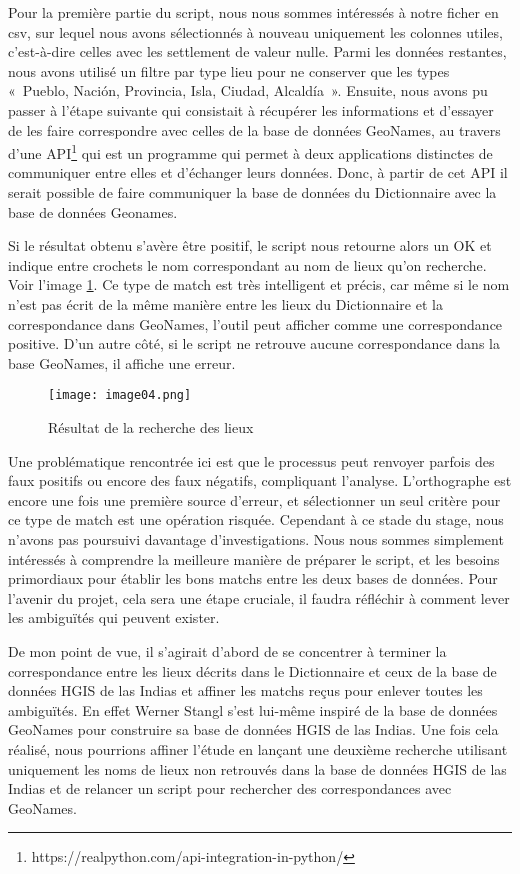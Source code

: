 \documentclass[a4paper,12pt,twoside]{book}
\begin{document}
Pour la première partie du script, nous nous sommes intéressés à notre ficher en csv, sur lequel nous avons sélectionnés à nouveau uniquement les colonnes utiles, c’est-à-dire celles avec les settlement de valeur nulle. Parmi les données restantes, nous avons utilisé un filtre par type lieu pour ne conserver que les types « Pueblo, Nación,  Provincia, Isla, Ciudad,  Alcaldía ». Ensuite, nous avons pu passer à l’étape suivante qui consistait à récupérer les informations et d’essayer de les faire correspondre avec celles de la base de données GeoNames, au travers d’une \Gls{API}\footnote{https://realpython.com/api-integration-in-python/} qui est un programme qui permet à deux applications distinctes de communiquer entre elles et d’échanger leurs données. Donc, à partir de cet API il serait possible de faire communiquer la base de données du Dictionnaire avec la base de données Geonames.

Si le résultat obtenu s’avère être positif, le script nous retourne alors un OK et indique entre crochets le nom correspondant au nom de lieux qu’on recherche. Voir l'image \ref{sixFig}. Ce type de match est très intelligent et précis, car même si le nom n’est pas écrit de la même manière entre les lieux du Dictionnaire et la correspondance dans GeoNames, l’outil peut afficher comme une correspondance positive. D’un autre côté, si le script ne retrouve aucune correspondance dans la base GeoNames, il affiche une erreur.\\
	

\begin{figure}[!h]
    \centering
    \texttt{[image: image04.png]}
    \caption{Résultat de la recherche des lieux}
    \label{sixFig}
\end{figure}

Une problématique rencontrée ici est que le processus peut renvoyer parfois des faux positifs ou encore des faux négatifs, compliquant l’analyse. L’orthographe est encore une fois une première source d’erreur, et sélectionner un seul critère pour ce type de match est une opération risquée. Cependant à ce stade du stage, nous n’avons pas poursuivi davantage d’investigations. Nous nous sommes simplement intéressés à comprendre la meilleure manière de préparer le script, et les besoins primordiaux pour établir les bons matchs entre les deux bases de données. Pour l’avenir du projet, cela sera une étape cruciale, il faudra réfléchir à comment lever les ambiguïtés qui peuvent exister. 

De mon point de vue, il s’agirait d’abord de se concentrer à terminer la correspondance entre les lieux décrits dans le Dictionnaire et ceux de la base de données HGIS de las Indias et affiner les matchs reçus pour enlever toutes les ambiguïtés. En effet Werner Stangl s’est lui-même inspiré de la base de données GeoNames pour construire sa base de données HGIS de las Indias. Une fois cela réalisé, nous pourrions affiner l’étude en lançant une deuxième recherche utilisant uniquement les noms de lieux non retrouvés dans la base de données HGIS de las Indias et de relancer un script pour rechercher des correspondances avec GeoNames. 
\end{document}
